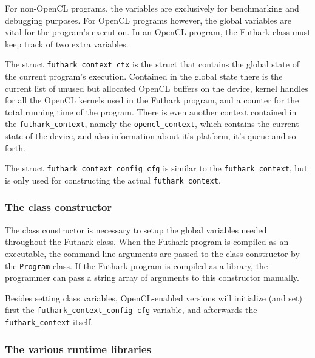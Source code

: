 For non-OpenCL programs, the variables are exclusively for benchmarking and
debugging purposes. For OpenCL programs however, the global variables are vital
for the program's execution.
In an OpenCL program, the Futhark class must keep track of two extra
variables.

The struct \texttt{futhark\_context ctx} is the struct that contains the global
state of the current program's execution. Contained in the global state there is
the current list of unused but allocated OpenCL buffers on the device, kernel
handles for all the OpenCL kernels used in the Futhark program, and a counter
for the total running time of the program.
There is even another context contained in the \texttt{futhark\_context}, namely
the \texttt{opencl\_context}, which contains the current state of the device,
and also information about it's platform, it's queue and so forth.

The struct \texttt{futhark\_context\_config cfg} is similar to the
\texttt{futhark\_context}, but is only used for constructing the actual
\texttt{futhark\_context}.

\subsubsection{The class constructor}
The class constructor is necessary to setup the global variables needed
throughout the Futhark class. When the Futhark program is compiled as an
executable, the command line arguments are passed to the class constructor by
the \texttt{Program} class. If the Futhark program is compiled as a library, the
programmer can pass a string array of arguments to this constructor manually.

Besides setting class variables, OpenCL-enabled versions will initialize (and
set) first the \texttt{futhark\_context\_config cfg} variable, and afterwards
the \texttt{futhark\_context} itself.

\subsubsection{The various runtime libraries}
\label{subsec:runtimelibs}

